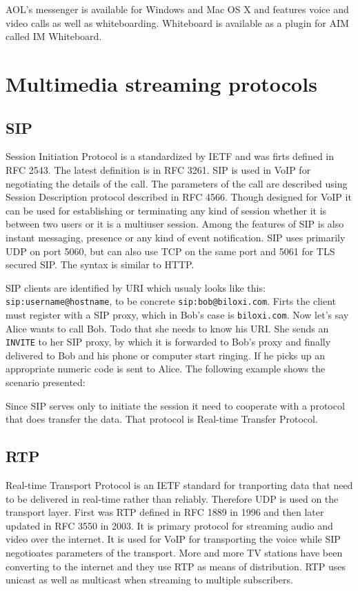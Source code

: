 AOL's messenger is available for Windows and Mac OS X and features voice and video calls as well as whiteboarding. Whiteboard is available as a plugin for AIM called IM Whiteboard. 

\section{Multimedia streaming protocols}
\subsection*{SIP}
Session Initiation Protocol is a standardized by IETF and was firts defined in RFC 2543. The latest definition is in RFC 3261. SIP is used in VoIP for negotiating the details of the call. The parameters of the call are described using Session Description protocol described in RFC 4566. Though designed for VoIP it can be used for establishing or terminating any kind of session whether it is between two users or it is a multiuser session. Among the features of SIP is also instant messaging, presence or any kind of event notification. SIP uses primarily UDP on port 5060, but can also use TCP on the same port and 5061 for TLS secured SIP. The syntax is similar to HTTP.

SIP clients are identified by URI which usualy looks like this: \verb|sip:username@hostname|, to be concrete \verb|sip:bob@biloxi.com|. Firts the client must register with a SIP proxy, which in Bob's case is \verb|biloxi.com|. Now let's say Alice wants to call Bob. Todo that she needs to know his URI. She sends an \verb|INVITE| to her SIP proxy, by which it is forwarded to Bob's proxy and finally delivered to Bob and his phone or computer start ringing. If he picks up an appropriate numeric code is sent to Alice. The following example\cite{SIPRFC} shows the scenario presented:    

%

Since SIP serves only to initiate the session it need to cooperate with a protocol that does transfer the data. That protocol is Real-time Transfer Protocol.  

\subsection*{RTP}
Real-time Transport Protocol is an IETF standard for tranporting data that need to be delivered in real-time rather than reliably. Therefore UDP is used on the transport layer. First was RTP defined in RFC 1889 in 1996 and then later updated in RFC 3550 in 2003. It is primary protocol for streaming audio and video over the internet. It is used for VoIP for transporting the voice while SIP negotioates parameters of the transport. More and more TV stations have been converting to the internet and they use RTP as means of distribution. RTP uses unicast as well as multicast when streaming to multiple subscribers.


